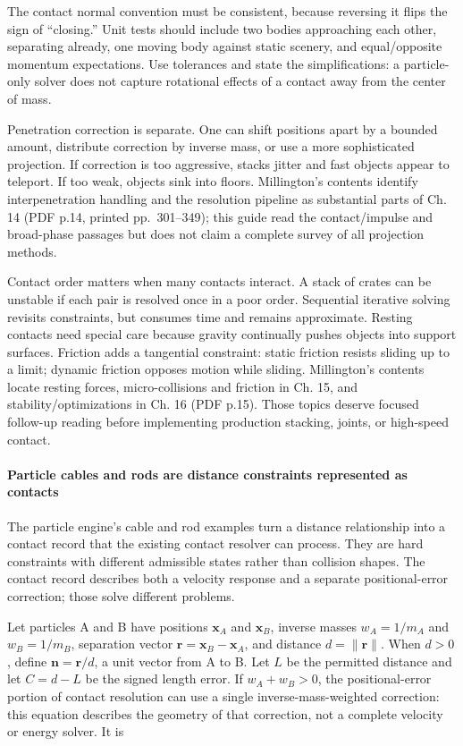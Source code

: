 The contact normal convention must be consistent, because reversing it flips the sign of ``closing.'' Unit tests should include two bodies approaching each other, separating already, one moving body against static scenery, and equal/opposite momentum expectations. Use tolerances and state the simplifications: a particle-only solver does not capture rotational effects of a contact away from the center of mass.

Penetration correction is separate. One can shift positions apart by a bounded amount, distribute correction by inverse mass, or use a more sophisticated projection. If correction is too aggressive, stacks jitter and fast objects appear to teleport. If too weak, objects sink into floors. Millington's contents identify interpenetration handling and the resolution pipeline as substantial parts of Ch. 14 (PDF p.14, printed pp.~301--349); this guide read the contact/impulse and broad-phase passages but does not claim a complete survey of all projection methods.

Contact order matters when many contacts interact. A stack of crates can be unstable if each pair is resolved once in a poor order. Sequential iterative solving revisits constraints, but consumes time and remains approximate. Resting contacts need special care because gravity continually pushes objects into support surfaces. Friction adds a tangential constraint: static friction resists sliding up to a limit; dynamic friction opposes motion while sliding. Millington's contents locate resting forces, micro-collisions and friction in Ch. 15, and stability/optimizations in Ch. 16 (PDF p.15). Those topics deserve focused follow-up reading before implementing production stacking, joints, or high-speed contact.

\paragraph{Particle cables and rods are distance constraints represented as contacts}\label{particle-cables-and-rods-are-distance-constraints-represented-as-contacts}

The particle engine's cable and rod examples turn a distance relationship into a contact record that the existing contact resolver can process. They are hard constraints with different admissible states rather than collision shapes. The contact record describes both a velocity response and a separate positional-error correction; those solve different problems.

Let particles A and B have positions \(\mathbf{x}_A\) and \(\mathbf{x}_B\), inverse masses \(w_A=1/m_A\) and \(w_B=1/m_B\), separation vector \(\mathbf{r}=\mathbf{x}_B-\mathbf{x}_A\), and distance \(d=\lVert\mathbf{r}\rVert\). When \(d>0\), define \(\mathbf{n}=\mathbf{r}/d\), a unit vector from A to B. Let \(L\) be the permitted distance and let \(C=d-L\) be the signed length error. If \(w_A+w_B>0\), the positional-error portion of contact resolution can use a single inverse-mass-weighted correction: this equation describes the geometry of that correction, not a complete velocity or energy solver. It is

